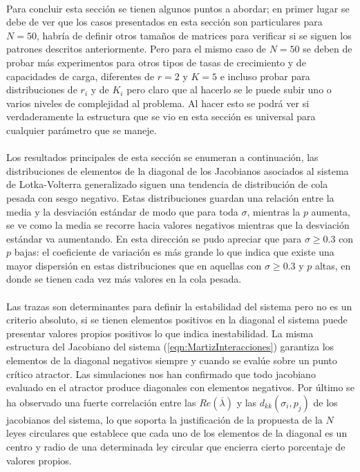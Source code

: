 \documentclass[a4paper,11pt]{book}
\theoremstyle{plain}
\theoremstyle{definition}
\begin{document}
\\
Para concluir esta sección se tienen algunos puntos a abordar; en primer lugar se debe de ver que los casos presentados en esta sección son particulares para $N=50$, habría de definir otros tamaños de matrices para verificar si se siguen los patrones descritos anteriormente. Pero para el mismo caso de $N=50$ se deben de probar más experimentos para otros tipos de tasas de crecimiento y de capacidades de carga, diferentes de $r=2$ y $K=5$ e incluso probar para distribuciones de $r_i$ y de $K_i$ pero claro que al hacerlo se le puede subir uno o varios niveles de complejidad al problema. Al hacer esto se podrá ver si verdaderamente la estructura que se vio en esta sección es universal para cualquier parámetro que se maneje.\\
\\
Los resultados principales de esta sección se enumeran a continuación, las distribuciones de elementos de la diagonal de los Jacobianos asociados al sistema de Lotka-Volterra generalizado siguen una tendencia de distribución de cola pesada con sesgo negativo. Estas distribuciones guardan una relación entre la media y la desviación estándar de modo que para toda $\sigma$, mientras la $p$ aumenta, se ve como la media se recorre hacia valores negativos mientras que la desviación estándar va aumentando. En esta dirección se pudo apreciar que para $\sigma\geq 0.3$ con $p$ bajas: el coeficiente de variación es más grande lo que indica que existe una mayor dispersión en estas distribuciones que en aquellas con $\sigma\geq 0.3$ y $p$ altas, en donde se tienen cada vez más valores en la cola pesada.\\
\\
Las trazas son determinantes para definir la estabilidad del sistema pero no es un criterio absoluto, si se tienen elementos positivos en la diagonal el sistema puede presentar valores propios positivos lo que indica inestabilidad. La misma estructura del Jacobiano del sistema (\ref{eqn:MartizInteracciones}) garantiza los elementos de la diagonal negativos siempre y cuando se evalúe sobre un punto crítico atractor. Las simulaciones nos han confirmado que todo jacobiano evaluado en el atractor produce diagonales con elementos negativos. Por último se ha observado una fuerte correlación entre las $Re(\overline{\lambda})$ y las $d_{kk}(\sigma_i,p_j)$ de los jacobianos del sistema, lo que soporta la justificación de la propuesta de la $N$ leyes circulares que establece que cada uno de los elementos de la diagonal es un centro y radio de una determinada ley circular que encierra cierto porcentaje de valores propios. \\
\end{document}
